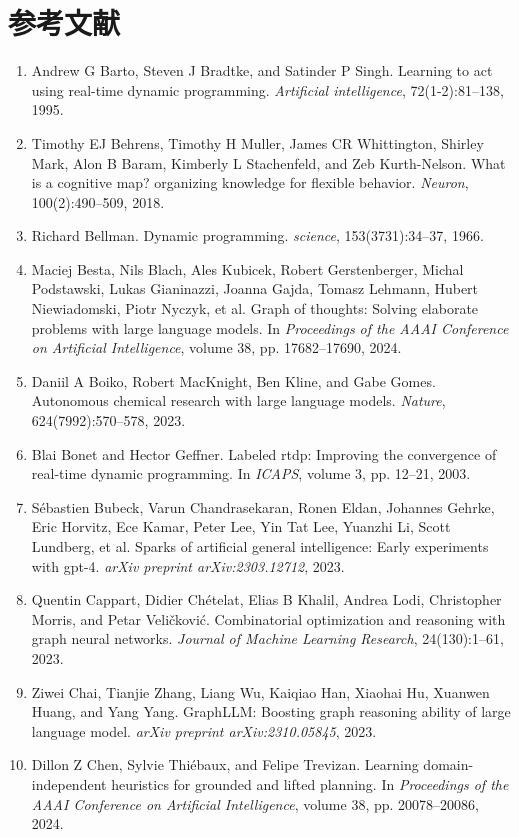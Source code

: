 \documentclass[11pt,UTF8,fontset=fandol]{ctexart}
\begin{document}
\section*{参考文献}
\begin{enumerate}[leftmargin=2em]
\item Andrew G Barto, Steven J Bradtke, and Satinder P Singh. Learning to act using real-time dynamic programming. \textit{Artificial intelligence}, 72(1-2):81--138, 1995.
\item Timothy EJ Behrens, Timothy H Muller, James CR Whittington, Shirley Mark, Alon B Baram, Kimberly L Stachenfeld, and Zeb Kurth-Nelson. What is a cognitive map? organizing knowledge for flexible behavior. \textit{Neuron}, 100(2):490--509, 2018.
\item Richard Bellman. Dynamic programming. \textit{science}, 153(3731):34--37, 1966.
\item Maciej Besta, Nils Blach, Ales Kubicek, Robert Gerstenberger, Michal Podstawski, Lukas Gianinazzi, Joanna Gajda, Tomasz Lehmann, Hubert Niewiadomski, Piotr Nyczyk, et al. Graph of thoughts: Solving elaborate problems with large language models. In \textit{Proceedings of the AAAI Conference on Artificial Intelligence}, volume 38, pp. 17682--17690, 2024.
\item Daniil A Boiko, Robert MacKnight, Ben Kline, and Gabe Gomes. Autonomous chemical research with large language models. \textit{Nature}, 624(7992):570--578, 2023.
\item Blai Bonet and Hector Geffner. Labeled rtdp: Improving the convergence of real-time dynamic programming. In \textit{ICAPS}, volume 3, pp. 12--21, 2003.
\item S\'ebastien Bubeck, Varun Chandrasekaran, Ronen Eldan, Johannes Gehrke, Eric Horvitz, Ece Kamar, Peter Lee, Yin Tat Lee, Yuanzhi Li, Scott Lundberg, et al. Sparks of artificial general intelligence: Early experiments with gpt-4. \textit{arXiv preprint arXiv:2303.12712}, 2023.
\item Quentin Cappart, Didier Ch\'etelat, Elias B Khalil, Andrea Lodi, Christopher Morris, and Petar Veli\v{c}kovi\'c. Combinatorial optimization and reasoning with graph neural networks. \textit{Journal of Machine Learning Research}, 24(130):1--61, 2023.
\item Ziwei Chai, Tianjie Zhang, Liang Wu, Kaiqiao Han, Xiaohai Hu, Xuanwen Huang, and Yang Yang. GraphLLM: Boosting graph reasoning ability of large language model. \textit{arXiv preprint arXiv:2310.05845}, 2023.
\item Dillon Z Chen, Sylvie Thi\'ebaux, and Felipe Trevizan. Learning domain-independent heuristics for grounded and lifted planning. In \textit{Proceedings of the AAAI Conference on Artificial Intelligence}, volume 38, pp. 20078--20086, 2024.

\end{enumerate}
\end{document}
